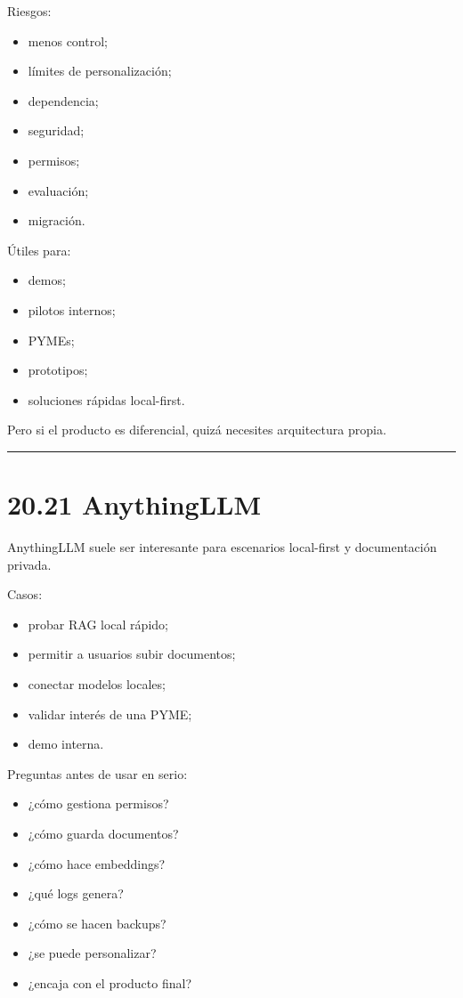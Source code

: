 Riesgos:

\begin{itemize}
\tightlist
\item
  menos control;
\item
  límites de personalización;
\item
  dependencia;
\item
  seguridad;
\item
  permisos;
\item
  evaluación;
\item
  migración.
\end{itemize}

Útiles para:

\begin{itemize}
\tightlist
\item
  demos;
\item
  pilotos internos;
\item
  PYMEs;
\item
  prototipos;
\item
  soluciones rápidas local-first.
\end{itemize}

Pero si el producto es diferencial, quizá necesites arquitectura propia.

\begin{center}\rule{0.5\linewidth}{0.5pt}\end{center}

\section{20.21 AnythingLLM}\label{anythingllm-1}

AnythingLLM suele ser interesante para escenarios local-first y
documentación privada.

Casos:

\begin{itemize}
\tightlist
\item
  probar RAG local rápido;
\item
  permitir a usuarios subir documentos;
\item
  conectar modelos locales;
\item
  validar interés de una PYME;
\item
  demo interna.
\end{itemize}

Preguntas antes de usar en serio:

\begin{itemize}
\tightlist
\item
  ¿cómo gestiona permisos?
\item
  ¿cómo guarda documentos?
\item
  ¿cómo hace embeddings?
\item
  ¿qué logs genera?
\item
  ¿cómo se hacen backups?
\item
  ¿se puede personalizar?
\item
  ¿encaja con el producto final?
\end{itemize}

